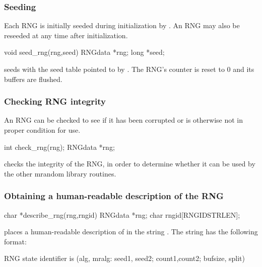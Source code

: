 \subsubsection{Seeding}
\label{sec:seedproc}

Each RNG is initially seeded during initialization by
.  An RNG may also be reseeded at any time after
initialization.\\

\begin{example}
	void seed_rng(rng,seed)
	RNGdata *rng;
	long *seed;\\
\end{example}

 seeds  with the seed table pointed to by .
The RNG's counter is reset to 0 and its buffers are flushed.

\subsubsection{Checking RNG integrity}
	An RNG can be checked to see if it has been corrupted or is
otherwise not in proper condition for use.\\

\begin{example}
	int check_rng(rng);
	RNGdata *rng;\\
\end{example}

 checks the integrity of the RNG, in order to determine
whether it can be used by the other mrandom library routines.

\subsubsection{Obtaining a human-readable description of the RNG}

\begin{example}
	char *describe_rng(rng,rngid)
	RNGdata *rng;
	char rngid[RNGIDSTRLEN];\\
\end{example}

 places a human-readable description of  in
the string .  The string has the following format:\\

\begin{example}
RNG state identifier is (alg, mralg: seed1, seed2; count1,count2;
bufsize, split)\\
\end{example}


